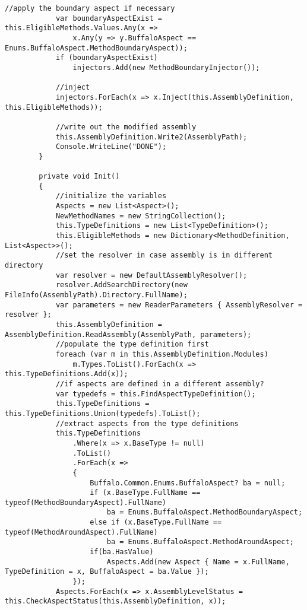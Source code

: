 \begin{lstlisting}[caption={../buffalo/Weaver.cs}, label=../buffalo/Weaver.cs, frame=tb, basicstyle=\scriptsize]
            //apply the boundary aspect if necessary
            var boundaryAspectExist = this.EligibleMethods.Values.Any(x =>
                x.Any(y => y.BuffaloAspect == Enums.BuffaloAspect.MethodBoundaryAspect));
            if (boundaryAspectExist)
                injectors.Add(new MethodBoundaryInjector());

            //inject
            injectors.ForEach(x => x.Inject(this.AssemblyDefinition, this.EligibleMethods));

            //write out the modified assembly
            this.AssemblyDefinition.Write2(AssemblyPath);
            Console.WriteLine("DONE");
        }

        private void Init()
        {
            //initialize the variables
            Aspects = new List<Aspect>();
            NewMethodNames = new StringCollection();
            this.TypeDefinitions = new List<TypeDefinition>();
            this.EligibleMethods = new Dictionary<MethodDefinition, List<Aspect>>();
            //set the resolver in case assembly is in different directory
            var resolver = new DefaultAssemblyResolver();
            resolver.AddSearchDirectory(new FileInfo(AssemblyPath).Directory.FullName);
            var parameters = new ReaderParameters { AssemblyResolver = resolver };
            this.AssemblyDefinition = AssemblyDefinition.ReadAssembly(AssemblyPath, parameters);
            //populate the type definition first
            foreach (var m in this.AssemblyDefinition.Modules)
                m.Types.ToList().ForEach(x => this.TypeDefinitions.Add(x));
            //if aspects are defined in a different assembly?
            var typedefs = this.FindAspectTypeDefinition();
            this.TypeDefinitions = this.TypeDefinitions.Union(typedefs).ToList();
            //extract aspects from the type definitions
            this.TypeDefinitions
                .Where(x => x.BaseType != null)
                .ToList()
                .ForEach(x =>
                {
                    Buffalo.Common.Enums.BuffaloAspect? ba = null;
                    if (x.BaseType.FullName == typeof(MethodBoundaryAspect).FullName)
                        ba = Enums.BuffaloAspect.MethodBoundaryAspect;
                    else if (x.BaseType.FullName == typeof(MethodAroundAspect).FullName)
                        ba = Enums.BuffaloAspect.MethodAroundAspect;
                    if(ba.HasValue)
                        Aspects.Add(new Aspect { Name = x.FullName, TypeDefinition = x, BuffaloAspect = ba.Value });
                });
            Aspects.ForEach(x => x.AssemblyLevelStatus = this.CheckAspectStatus(this.AssemblyDefinition, x));

\end{lstlisting}

